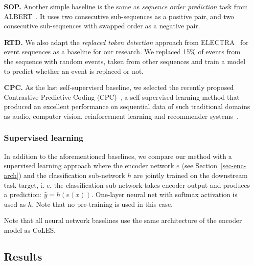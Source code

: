 \documentclass[sigconf]{acmart}
\begin{document}
\textbf{SOP.} Another simple baseline is the same as \textit{sequence order prediction} task from ALBERT~\citep{Lan2020ALBERTAL}. It uses two consecutive sub-sequences as a positive pair, and two consecutive sub-sequences with swapped order as a negative pair.

\textbf{RTD.} We also adapt the \textit{replaced token detection} approach from ELECTRA~\citep{Clark2020ELECTRAPT} for event sequences as a baseline for our research. We replaced 15\% of events from the sequence with random events, taken from other sequences and train a model to predict whether an event is replaced or not.

\textbf{CPC.} As the last self-supervised baseline, we selected the recently proposed Contrastive Predictive Coding (CPC)~\citep{Oord2018RepresentationLW}, a self-supervised learning method that produced an excellent performance on sequential data of such traditional domains as audio, computer vision, reinforcement learning and recommender systems~\citep{Zhou2020ContrastiveLF}.

\subsubsection{Supervised learning}

In addition to the aforementioned baselines, we compare our method with a supervised learning approach where the encoder network $e$ (see Section~\ref{sec-enc-arch}) and the classification sub-network $h$ are jointly trained on the downstream task target, i. e. the classification sub-network takes encoder output and produces a prediction: $\hat{y} = h(e(x))$. One-layer neural net with softmax activation is used as $h$. Note that no pre-training is used in this case.

Note that all neural network baselines use the same architecture of the encoder model as CoLES.


\subsection{Results} \label{sec-res}
\end{document}
